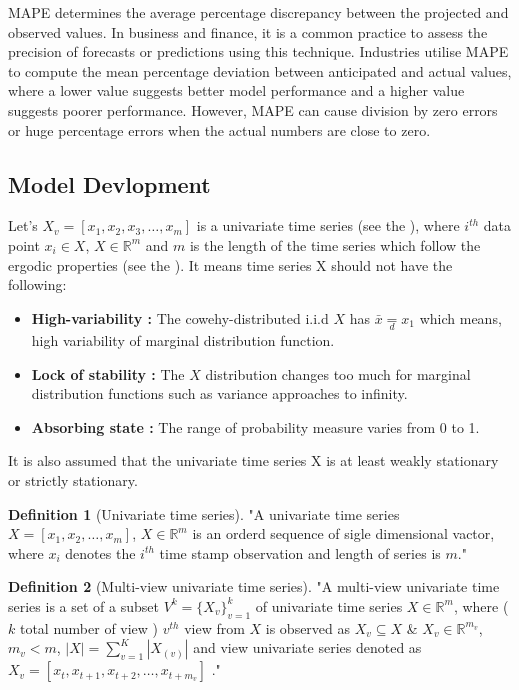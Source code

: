 \documentclass[a4paper, fleqn]{cas-sc}
\theoremstyle{definition}
\newtheorem{definition}{Definition}[section]
\theoremstyle{remark}
\begin{document}
MAPE determines the average percentage discrepancy between the projected and observed values. In business and finance,  it is a common practice to assess the precision of forecasts or predictions using this technique. Industries utilise MAPE to compute the mean percentage deviation between anticipated and actual values,  where a lower value suggests better model performance and a higher value suggests poorer performance. However,  MAPE can cause division by zero errors or huge percentage errors when the actual numbers are close to zero.

\subsection{Model Devlopment}
Let's $X_v=[ x_1, x_2, x_3, \dots ,x_m]$ is a univariate time series (see the ),  where $i^{th}$ data point $x_i \in X$,  $X \in \mathbb{R}^m$ and $m$ is the length of the time series which follow the ergodic properties (see the ). It means time series X should not have the following: 

\begin{itemize}
  \item \textbf{High-variability : } The cowehy-distributed i.i.d $X $ has $\bar{x}\underset{d}{=} x_1$ which means,  high variability of marginal distribution function.
  \item \textbf{Lock of stability : } The $X$ distribution changes too much for marginal distribution functions such as variance approaches to infinity.
  \item \textbf{Absorbing state : } The range of probability measure varies from 0 to 1.
\end{itemize}
It is also assumed that the univariate time series X is at least weakly stationary or strictly stationary.


\begin{definition}[Univariate time series] \label{univts}
  "A univariate time series $X=[x_1, x_2, \dots, x_m]$,  $X\in \mathbb{R}^m$ is an orderd sequence of sigle dimensional vactor,  where $x_i$ denotes the $i^{th}$ time stamp observation and length of series is $m$."
\end{definition}

  \begin{definition}[Multi-view univariate time series]\label{mvts}
    "A multi-view univariate time series is a set of a subset $V^k= \{X_{v} \}_{v=1}^k$ of univariate time series $X\in \mathbb{R}^m$,  where ($k$ total number of view ) $v^{th}$ view from $X$ is observed as $X_v \subseteq X$ \& $X_v \in \mathbb{R}^{m_v}$,  $m_{v} < m$,  $\left|X  \right|= \sum_{v=1}^{K} \left| X_{(v)} \right|$ and view univariate series denoted as $X_v=[ x_t, x_{t+1}, x_{t+2}, \dots, x_{t+m_v} ]$ ."
  \end{definition} 
\end{document}
